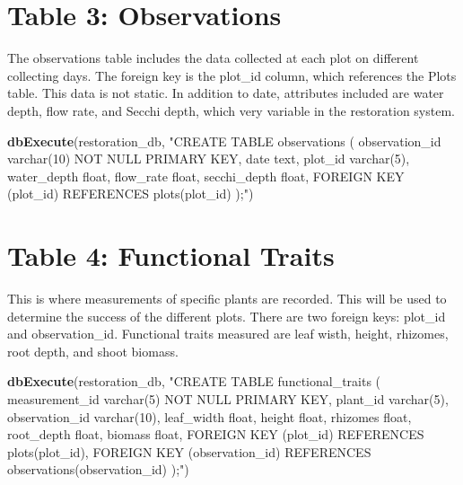 \documentclass[
]{book}
\newenvironment{Shaded}{\begin{snugshade}}{\end{snugshade}}
\newcommand{\KeywordTok}[1]{\textcolor[rgb]{0.13,0.29,0.53}{\textbf{#1}}}
\newcommand{\NormalTok}[1]{#1}
\newcommand{\StringTok}[1]{\textcolor[rgb]{0.31,0.60,0.02}{#1}}
\begin{document}
\hypertarget{table-3-observations}{%
\section{Table 3: Observations}\label{table-3-observations}}

The observations table includes the data collected at each plot on different collecting days. The foreign key is the plot\_id column, which references the Plots table. This data is not static. In addition to date, attributes included are water depth, flow rate, and Secchi depth, which very variable in the restoration system.

\begin{Shaded}
\begin{Highlighting}[]
\KeywordTok{dbExecute}\NormalTok{(restoration_db, }\StringTok{"CREATE TABLE observations (}
\StringTok{          observation_id varchar(10) NOT NULL PRIMARY KEY,}
\StringTok{          date text,}
\StringTok{          plot_id varchar(5), }
\StringTok{          water_depth float, }
\StringTok{          flow_rate float,}
\StringTok{          secchi_depth float,}
\StringTok{          FOREIGN KEY (plot_id) REFERENCES plots(plot_id)}
\StringTok{          );"}\NormalTok{)}
\end{Highlighting}
\end{Shaded}

\hypertarget{table-4-functional-traits}{%
\section{Table 4: Functional Traits}\label{table-4-functional-traits}}

This is where measurements of specific plants are recorded. This will be used to determine the success of the different plots. There are two foreign keys: plot\_id and observation\_id. Functional traits measured are leaf wisth, height, rhizomes, root depth, and shoot biomass.

\begin{Shaded}
\begin{Highlighting}[]
\KeywordTok{dbExecute}\NormalTok{(restoration_db, }\StringTok{"CREATE TABLE functional_traits (}
\StringTok{          measurement_id varchar(5) NOT NULL PRIMARY KEY,}
\StringTok{          plant_id varchar(5),}
\StringTok{          observation_id varchar(10), }
\StringTok{          leaf_width float, }
\StringTok{          height float, }
\StringTok{          rhizomes float, }
\StringTok{          root_depth float,}
\StringTok{          biomass float, }
\StringTok{          FOREIGN KEY (plot_id) REFERENCES plots(plot_id),}
\StringTok{          FOREIGN KEY (observation_id) REFERENCES observations(observation_id)}
\StringTok{          );"}\NormalTok{)}
\end{Highlighting}
\end{Shaded}
\end{document}
